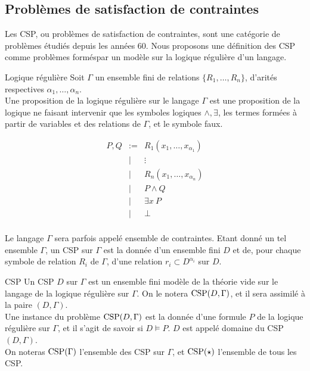 \subsection{Problèmes de satisfaction de contraintes}

Les CSP, ou problèmes de satisfaction de contraintes, sont une catégorie de problèmes étudiés depuis les années 60. Nous proposons une définition des CSP comme problèmes forméspar un modèle sur la logique régulière d'un langage.


\begin{defi}{Logique régulière}
Soit $\Gamma$ un ensemble fini de relations $\{R_1,\dots,R_n\}$, d'arités respectives $\alpha_1,\dots,\alpha_n$.\\
Une proposition de la logique régulière sur le langage $\Gamma$ est une proposition de la logique ne faisant intervenir que les symboles logiques $\wedge, \exists$, les termes formées à partir de variables et des relations de $\Gamma$, et le symbole faux.

    \[\begin{array}{rcl}
P,Q & := & R_1(x_1, \dots, x_{\alpha_1}) \\
& |  & \vdots                        \\
& |  & R_n(x_1, \dots, x_{\alpha_n}) \\
& |  & P \wedge Q                    \\
& |  & \exists x \ P                  \\
& |  & \bot                          \\
\end{array}\]
\end{defi}

Le langage $\Gamma$ sera parfois appelé ensemble de contraintes. Etant donné un tel ensemble $\Gamma$, un CSP sur $\Gamma$ est la donnée d'un ensemble fini $D$ et de, pour chaque symbole de relation $R_i$ de $\Gamma$, d'une relation $r_i \subset D^{\alpha_i}$ sur $D$. 


\begin{defi}{CSP}
Un CSP $D$ sur $\Gamma$ est un ensemble fini modèle de la théorie vide sur le langage de la logique régulière sur $\Gamma$. On le notera $\text{CSP} (D,\Gamma)$, et il sera assimilé à la paire $(D,\Gamma)$.\\
Une instance du problème $\text{CSP} (D,\Gamma)$ est la donnée d'une formule $P$ de la logique régulière sur $\Gamma$, et il s'agit de savoir si $D \models P$. $D$ est appelé domaine du CSP $(D,\Gamma)$.
\\On noteras $\text{CSP} (\Gamma)$ l'ensemble des CSP sur $\Gamma$, et $\text{CSP} (\star)$ l'ensemble de tous les CSP.
\end{defi}

